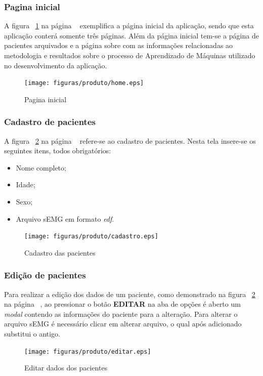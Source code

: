 \subsubsection{Pagina inicial}
A figura ~\ref{fighome} na página ~\pageref{fighome} exemplifica a página inicial da aplicação, sendo que esta aplicação  conterá somente três páginas. Além da página inicial tem-se a página de pacientes arquivados e a página sobre com as informações relacionadas ao metodologia e resultados sobre o processo de Aprendizado de Máquinas utilizado no desenvolvimento da aplicação.

\begin{figure}[!htb]
    \centering
    \texttt{[image: figuras/produto/home.eps]}
    \caption{Pagina inicial}
    \label{fighome}
\end{figure}

\subsubsection{Cadastro de pacientes}
A figura ~\ref{figcadastro} na página ~\pageref{figcadastro} refere-se ao cadastro de pacientes. Nesta tela insere-se os seguintes itens, todos obrigatórios:
\begin{itemize}
    \item Nome completo;
    \item Idade;
    \item Sexo;
    \item Arquivo sEMG em formato \textit{edf}.
\end{itemize}

\begin{figure}[!htb]
    \centering
    \texttt{[image: figuras/produto/cadastro.eps]}
    \caption{Cadastro das pacientes}
    \label{figcadastro}
\end{figure}

\subsubsection{Edição de pacientes}
Para realizar a edição dos dados de um paciente, como demonstrado na figura ~\ref{figcadastro} na página ~\pageref{figcadastro}, ao pressionar o botão \textbf{EDITAR} na aba de opções é aberto um \textit{modal} contendo as informações do paciente para a alteração. Para alterar o arquivo sEMG é necessário clicar em alterar arquivo, o qual após adicionado substitui o antigo.

\begin{figure}[!htb]
    \centering
    \texttt{[image: figuras/produto/editar.eps]}
    \caption{Editar dados dos pacientes}
    \label{figeditar}
\end{figure}

